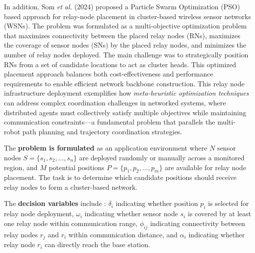 In addition, Som \textit{et al.} (2024) \cite{som_2024_particle} proposed a Particle Swarm Optimization (PSO) based approach for relay-node placement in cluster-based wireless sensor networks (WSNs). The problem was formulated as a multi-objective optimization problem that maximizes connectivity between the placed relay nodes (RNs), maximizes the coverage of sensor nodes (SNs) by the placed relay nodes, and minimizes the number of relay nodes deployed. The main challenge was to strategically position RNs from a set of candidate locations to act as cluster heads. This optimized placement approach balances both cost-effectiveness and performance requirements to enable efficient network backbone construction.
This relay node infrastructure deployment exemplifies how \textit{meta-heuristic optimization techniques} can address complex coordination challenges in networked systems, where distributed agents must collectively satisfy multiple objectives while maintaining communication constraints---a fundamental problem that parallels the multi-robot path planning and trajectory coordination strategies.

The \textbf{problem is formulated} as an application environment where \(N\) sensor nodes \(S = \{s_1, s_2, \dots, s_n\}\) are deployed randomly or manually across a monitored region, and \(M\) potential positions \(P = \{p_1, p_2, \dots, p_m\}\) are available for relay node placement. The task is to determine which candidate positions should receive relay nodes to form a cluster-based network.

The \textbf{decision variables} include :
\(\delta_i\) indicating whether position \(p_i\) is selected for relay node deployment,
\(\omega_i\) indicating whether sensor node \(s_i\) is covered by at least one relay node within communication range, 
\(\phi_{ij}\) indicating connectivity between relay nodes \(r_j\) and \(r_i\) within communication distance, 
and \(\alpha_i\) indicating whether relay node \(r_i\) can directly reach the base station.

